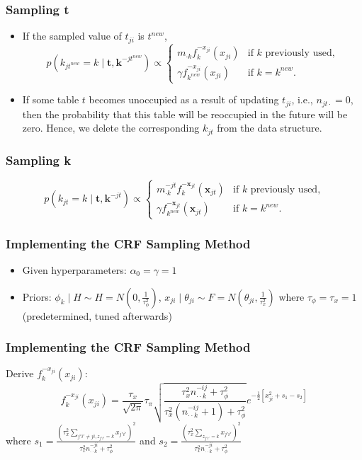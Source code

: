 \documentclass{beamer}
\begin{document}
	\begin{frame}
		\frametitle{Sampling t}
		\begin{itemize}
			\item If the sampled value of $t_{ji}$ is $t^{new}$,
			\begin{equation*}
				p(k_{jt^{new}}=k \mid \boldsymbol{t},\boldsymbol{k}^{-jt^{new}}) \propto
				\begin{cases}
					m_{\cdot k}f_k^{-x_{ji}}(x_{ji})& \text{if $k$ previously used,} \\
					\gamma f_{k^{new}}^{-x_{ji}}(x_{ji})& \text{if $k=k^{new}$.}
				\end{cases}
			\end{equation*}
			\item If some table $t$ becomes unoccupied as a result of updating $t_{ji}$, i.e., $n_{jt\cdot}=0$, then the probability that this table will be reoccupied in the future will be zero. Hence, we delete the corresponding $k_{jt}$ from the data structure.
		\end{itemize}
	\end{frame}
	\begin{frame}
		\frametitle{Sampling k}
		\begin{equation*}
			p(k_{jt}=k \mid \boldsymbol{t},\boldsymbol{k}^{-jt}) \propto
			\begin{cases}
				m_{\cdot k}^{-jt}f_k^{-\boldsymbol{x}_{jt}}(\boldsymbol{x}_{jt})& \text{if $k$ previously used,} \\
				\gamma f_{k^{new}}^{-\boldsymbol{x}_{jt}}(\boldsymbol{x}_{jt})& \text{if $k=k^{new}$.}
			\end{cases}
		\end{equation*}
	\end{frame}
 \begin{frame}
		\frametitle{Implementing the CRF Sampling Method}
		\begin{itemize}
			\item Given hyperparameters: $\alpha_0=\gamma=1$
			\item Priors:
			$\phi_k \mid H \sim H=N(0,\frac{1}{\tau_\phi^2})$, $x_{ji} \mid \theta_{ji} \sim F=N(\theta_{ji},\frac{1}{\tau_x^2})$
			where $\tau_\phi=\tau_x=1$ (predetermined, tuned afterwards)
		\end{itemize}
	\end{frame}
	\begin{frame}
		\frametitle{Implementing the CRF Sampling Method}
		Derive $f_k^{-x_{ji}}(x_{ji})$:
		\begin{equation*}
			f_k^{-x_{ji}}(x_{ji})=\frac{\tau_x}{\sqrt{2\pi}}\tau_\pi\sqrt{\frac{\tau_x^2n_{\cdot\cdot k}^{-ij}+\tau_\phi^2}{\tau_x^2(n_{\cdot\cdot k}^{-ij}+1)+\tau_\phi^2}} e^{-\frac{1}{2}[x_{ji}^2+s_1 -s_2]}
		\end{equation*}
		where $s_1=\frac{(\tau_x^2\sum_{j'i'\neq ji,z_{j'i'}=k}x_{j'i'})^2}{\tau_x^2n_{\cdot\cdot k}^{-ji}+\tau_\phi^2}$ and $s_2=\frac{(\tau_x^2\sum_{z_{j'i'}=k}x_{j'i'})^2}{\tau_x^2n_{\cdot\cdot k}^{-ji}+\tau_\phi^2}$
	\end{frame}
\end{document}
